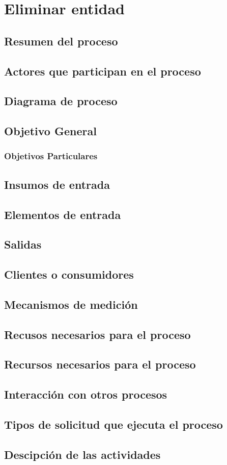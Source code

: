 \hypertarget{procesoEliminarEntidad}{}
\section{Eliminar entidad}
\subsection{Resumen del proceso}
\subsection{Actores que participan en el proceso}
\subsection{Diagrama de proceso}
\subsection{Objetivo General}
\subsubsection{Objetivos Particulares}
\subsection{Insumos de entrada}
\subsection{Elementos de entrada}
\subsection{Salidas}
\subsection{Clientes o consumidores}
\subsection{Mecanismos de medici\'on}
\subsection{Recusos necesarios para el proceso}
\subsection{Recursos necesarios para el proceso}
\subsection{Interacci\'on con otros procesos}
\subsection{Tipos de solicitud que ejecuta el proceso}
\subsection{Descipci\'on de las actividades}
